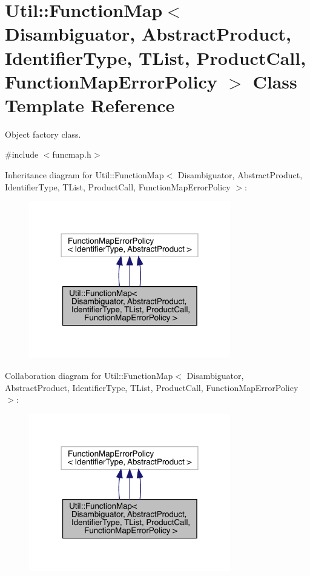 \hypertarget{classUtil_1_1FunctionMap}{}\section{Util\+:\+:Function\+Map$<$ Disambiguator, Abstract\+Product, Identifier\+Type, T\+List, Product\+Call, Function\+Map\+Error\+Policy $>$ Class Template Reference}
\label{classUtil_1_1FunctionMap}


Object factory class.  




{\ttfamily \#include $<$funcmap.\+h$>$}



Inheritance diagram for Util\+:\+:Function\+Map$<$ Disambiguator, Abstract\+Product, Identifier\+Type, T\+List, Product\+Call, Function\+Map\+Error\+Policy $>$\+:
\nopagebreak
\begin{figure}[H]
\begin{center}
\leavevmode
\includegraphics[width=249pt]{dd/d77/classUtil_1_1FunctionMap__inherit__graph}
\end{center}
\end{figure}


Collaboration diagram for Util\+:\+:Function\+Map$<$ Disambiguator, Abstract\+Product, Identifier\+Type, T\+List, Product\+Call, Function\+Map\+Error\+Policy $>$\+:
\nopagebreak
\begin{figure}[H]
\begin{center}
\leavevmode
\includegraphics[width=249pt]{de/d10/classUtil_1_1FunctionMap__coll__graph}
\end{center}
\end{figure}
